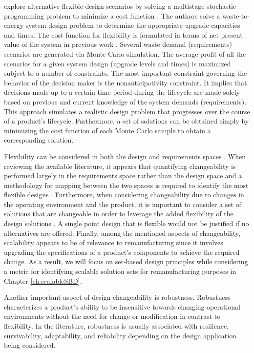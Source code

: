 \citeauthor{Cardin2017} explore alternative flexible design scenarios by solving a multistage stochastic programming problem to minimize a cost function \cite{Cardin2017}. The authors solve a waste-to-energy system design problem to determine the appropriate upgrade capacities and times. The cost function for flexibility is formulated in terms of net present value of the system in previous work \cite{Cardin2016}. Several waste demand (requirements) scenarios are generated via Monte Carlo simulation. The average profit of all the scenarios for a given system design (upgrade levels and  times) is maximized subject to a number of constraints. The most important constraint governing the behavior of the decision maker is the nonanticipativity constraint. It implies that decisions made up to a certain time period during the lifecycle are made solely based on previous and current knowledge of the system demands (requirements). This approach simulates a realistic design problem that progresses over the course of a product's lifecycle. Furthermore, a set of solutions can be obtained simply by minimizing the cost function of each Monte Carlo sample to obtain a corresponding solution.

Flexibility can be considered in both the design and requirements spaces \cite{Ferguson2008}. When reviewing the available literature, it appears that quantifying changeability is performed largely in the requirements space rather than the design space and a methodology for mapping between the two spaces is required to identify the most flexible designs \cite{Tackett2014,Olewnik2004,Liu2008,Yannou2003}. Furthermore, when considering changeability due to changes in the operating environment and the product, it is important to consider a set of solutions that are changeable in order to leverage the added flexibility of the design solutions \cite{Olewnik2004,Liu2008,Suh2007}. A single point design that is flexible would not be justified if no alternatives are offered. Finally, among the mentioned aspects of changeability, scalability appears to be of relevance to remanufacturing since it involves upgrading the specifications of a product's components to achieve the required change. As a result, we will focus on set-based design principles while considering a metric for identifying scalable solution sets for remanufacturing purposes in Chapter \ref{ch:scalableSBD}.

Another important aspect of design changeability is robustness. Robustness characterizes a product's ability to be insensitive towards changing operational environments without the need for change or modification in contrast to flexibility. In the literature, robustness is usually associated with resilience, survivability, adaptability, and reliability depending on the design application being considered. 

